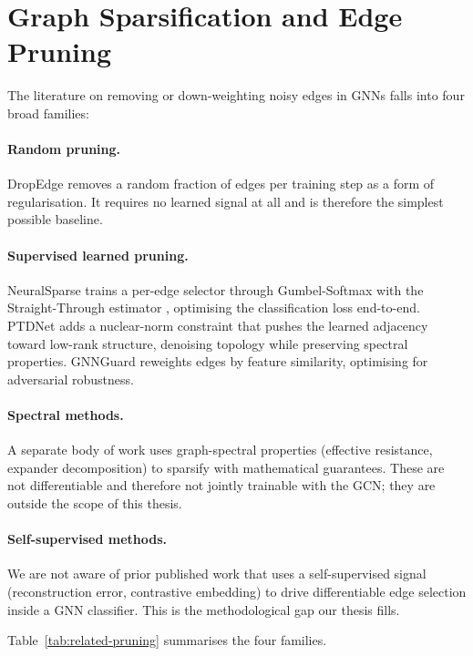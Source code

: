 \documentclass[11pt,a4paper]{report}
\theoremstyle{definition}
\theoremstyle{remark}
\begin{document}
\section{Graph Sparsification and Edge Pruning}

The literature on removing or down-weighting noisy edges in GNNs falls
into four broad families:

\paragraph{Random pruning.}
DropEdge \cite{rong2020dropedge} removes a random fraction of edges per
training step as a form of regularisation. It requires no learned
signal at all and is therefore the simplest possible baseline.

\paragraph{Supervised learned pruning.}
NeuralSparse \cite{zheng2020neuralsparse} trains a per-edge selector
through Gumbel-Softmax with the Straight-Through estimator
\cite{jang2017gumbel,maddison2017concrete,bengio2013ste}, optimising
the classification loss end-to-end. PTDNet \cite{luo2021ptdnet} adds a
nuclear-norm constraint that pushes the learned adjacency toward
low-rank structure, denoising topology while preserving spectral
properties. GNNGuard \cite{zhang2020gnnguard} reweights edges by
feature similarity, optimising for adversarial robustness.

\paragraph{Spectral methods.}
A separate body of work uses graph-spectral properties (effective
resistance, expander decomposition) to sparsify with mathematical
guarantees. These are not differentiable and therefore not jointly
trainable with the GCN; they are outside the scope of this thesis.

\paragraph{Self-supervised methods.}
We are not aware of prior published work that uses a self-supervised
signal (reconstruction error, contrastive embedding) to drive
differentiable edge selection inside a GNN classifier. This is the
methodological gap our thesis fills.

Table~\ref{tab:related-pruning} summarises the four families.
\end{document}
